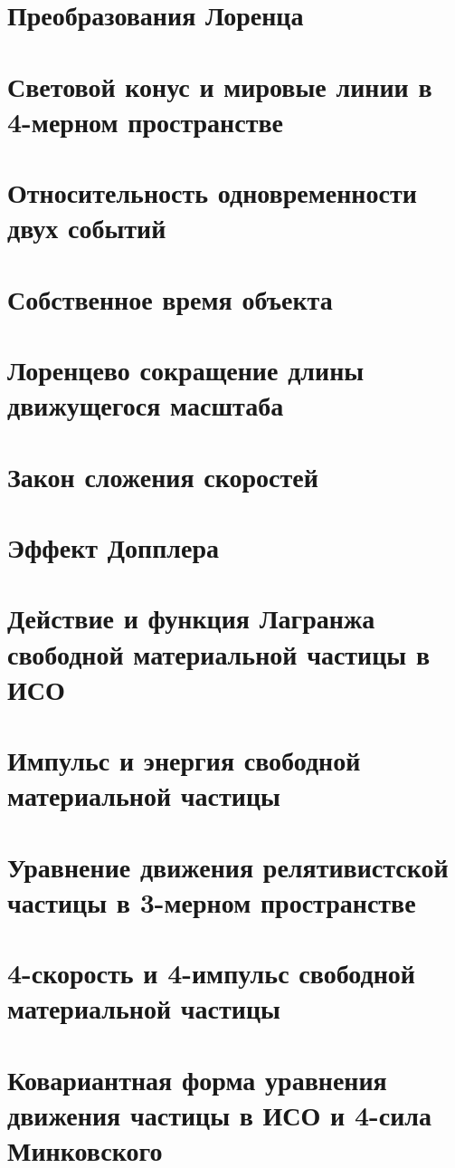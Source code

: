 \begin{multicols*}{2}
		\section{Преобразования Лоренца}
		\section{Световой конус и мировые линии в 4-мерном пространстве}
		\section{Относительность одновременности двух событий}
		\section{Собственное время объекта}
		\section{Лоренцево сокращение длины движущегося масштаба}
		\section{Закон сложения скоростей}
		\section{Эффект Допплера}
		\section{Действие и функция Лагранжа свободной материальной частицы в ИСО}
		\section{Импульс и энергия свободной материальной частицы}
		\section{Уравнение движения релятивистской частицы в 3-мерном пространстве}
		\section{4-скорость и 4-импульс свободной материальной частицы}
		\section{Ковариантная форма уравнения движения частицы в ИСО и 4-сила Минковского}

\end{multicols*}
